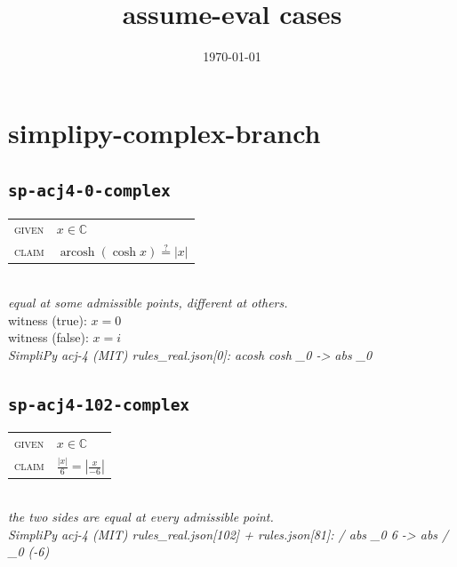 \documentclass[11pt]{article}
\title{assume-eval cases}
\date{\today}
\begin{document}
\maketitle
\section*{simplipy-complex-branch}
\subsection*{\texttt{sp-acj4-0-complex}}
\begin{tabular}{@{}l@{\quad}l@{}}
\textsc{given} & $x \in \mathbb{C}$ \\[4pt]
\textsc{claim} & $\displaystyle \operatorname{arcosh}\left(\cosh x\right) \overset{?}{=} \left|x\right|$ \\
\end{tabular}\\[2pt]
{\small\emph{equal at some admissible points, different at others.}}\\
{\footnotesize\color{gray}witness (true): $x = 0$}\\
{\footnotesize\color{gray}witness (false): $x = i$}\\
\emph{SimpliPy acj-4 (MIT) rules\_real.json[0]: acosh cosh \_0  ->  abs \_0}\\

\subsection*{\texttt{sp-acj4-102-complex}}
\begin{tabular}{@{}l@{\quad}l@{}}
\textsc{given} & $x \in \mathbb{C}$ \\[4pt]
\textsc{claim} & $\displaystyle \frac{\left|x\right|}{6} = \left|\frac{x}{-6}\right|$ \\
\end{tabular}\\[2pt]
{\small\emph{the two sides are equal at every admissible point.}}\\
\emph{SimpliPy acj-4 (MIT) rules\_real.json[102] + rules.json[81]: / abs \_0 6  ->  abs / \_0 (-6)}\\
\end{document}
